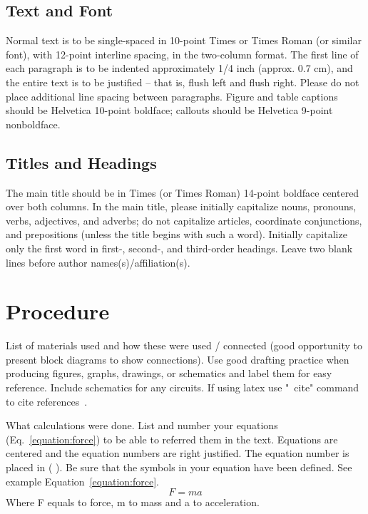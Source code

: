 \documentclass[journal]{IEEEtran}
\begin{document}
\subsection{Text and Font}
Normal text is to be single-spaced in 10-point Times or Times Roman (or similar font), with 12-point interline spacing, in the two-column 
format. The first line of each paragraph is to be indented approximately 1/4 inch (approx. 0.7 cm), and the entire text is to be justified -- that is, flush left and flush right. Please do not place additional line spacing between paragraphs. Figure and table captions should be Helvetica 10-point boldface; callouts should be Helvetica 9-point 
nonboldface.  \\

\subsection{Titles and Headings}
The main title should be in Times (or Times Roman) 14-point boldface centered over both columns. In the main title, please initially capitalize nouns, pronouns, verbs, adjectives, and adverbs; do not capitalize articles, coordinate conjunctions, and prepositions (unless the title begins with such a word). Initially capitalize only the first word in first-, second-, and third-order headings. Leave two blank lines before author names(s)/affiliation(s).

\section{Procedure}
List of materials used and how these were used / connected (good opportunity to present block diagrams to show connections).
Use good drafting practice when producing figures, graphs, drawings, or schematics and label them for easy
reference. Include schematics for any circuits. 
If using latex use "~cite" command to cite references~\cite{xbandvla}\cite{solartemp}.

What calculations were done. List and number your equations (Eq.~\ref{equation:force}) to be able to referred them in the text. Equations are centered and the equation numbers are right justified. The equation number is placed in ( ). Be sure that the symbols in your equation have been defined. See example Equation~\ref{equation:force}. 
\begin{equation}
    F = ma
    \label{equation:force}
\end{equation}
Where F equals to force, m to mass and a to acceleration.  
\end{document}
